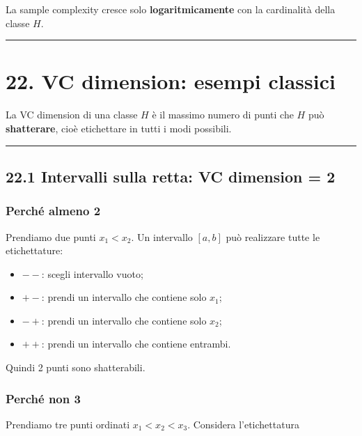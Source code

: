 \documentclass{article}
\providecommand{\tightlist}{%
  \setlength{\itemsep}{0pt}\setlength{\parskip}{0pt}}
\begin{document}
La sample complexity cresce solo \textbf{logaritmicamente} con la
cardinalità della classe \(H\).

\begin{center}\rule{0.5\linewidth}{0.5pt}\end{center}

\section{22. VC dimension: esempi
classici}\label{vc-dimension-esempi-classici}

La VC dimension di una classe \(H\) è il massimo numero di punti che
\(H\) può \textbf{shatterare}, cioè etichettare in tutti i modi
possibili.

\begin{center}\rule{0.5\linewidth}{0.5pt}\end{center}

\subsection{22.1 Intervalli sulla retta: VC dimension =
2}\label{intervalli-sulla-retta-vc-dimension-2}

\subsubsection{Perché almeno 2}\label{perchuxe9-almeno-2}

Prendiamo due punti \(x_1<x_2\). Un intervallo \([a,b]\) può realizzare
tutte le etichettature:

\begin{itemize}
\tightlist
\item
  \(--\): scegli intervallo vuoto;
\item
  \(+-\): prendi un intervallo che contiene solo \(x_1\);
\item
  \(-+\): prendi un intervallo che contiene solo \(x_2\);
\item
  \(++\): prendi un intervallo che contiene entrambi.
\end{itemize}

Quindi 2 punti sono shatterabili.

\subsubsection{Perché non 3}\label{perchuxe9-non-3}

Prendiamo tre punti ordinati \(x_1<x_2<x_3\). Considera l'etichettatura
\end{document}
